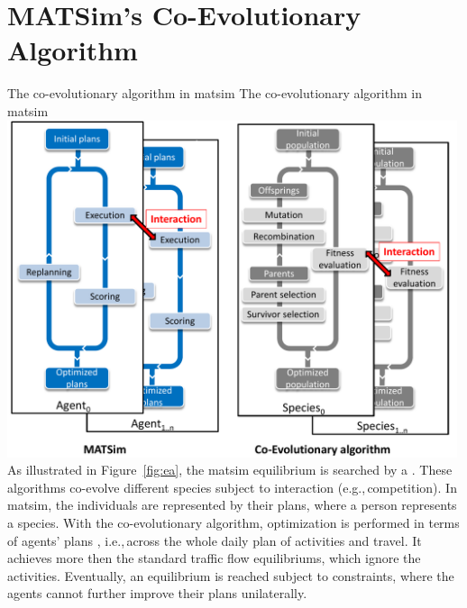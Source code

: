 \section{MATSim's Co-Evolutionary Algorithm}
\label{sec:co-ev}
%
\createfigure%
{The co-evolutionary algorithm in \protect\gls{matsim}}%
{The co-evolutionary algorithm in \protect\gls{matsim}
%
%
}%
{\label{fig:ea}}%
{\includegraphics[width=0.99\textwidth, angle=0]{using/figures/MATSimVSea.pdf}}%
{}
%
%
As illustrated in Figure~\ref{fig:ea}, the \gls{matsim} equilibrium is searched by a \emph{} \citep[see e.g.,][]{PopoviciEtAl_2012}. These \glspl{algorithm} co-evolve different species subject to interaction (e.g.,\,competition). In \gls{matsim}, the individuals are represented by their plans, where a person represents a species. With the co-evolutionary algorithm, optimization is performed in terms of agents' plans , i.e.,\,across the whole daily plan of activities and travel. It achieves more then the standard traffic flow \glspl{equilibrium}, which ignore the activities. Eventually, an equilibrium is reached subject to constraints, where the agents cannot further improve their plans unilaterally. 

